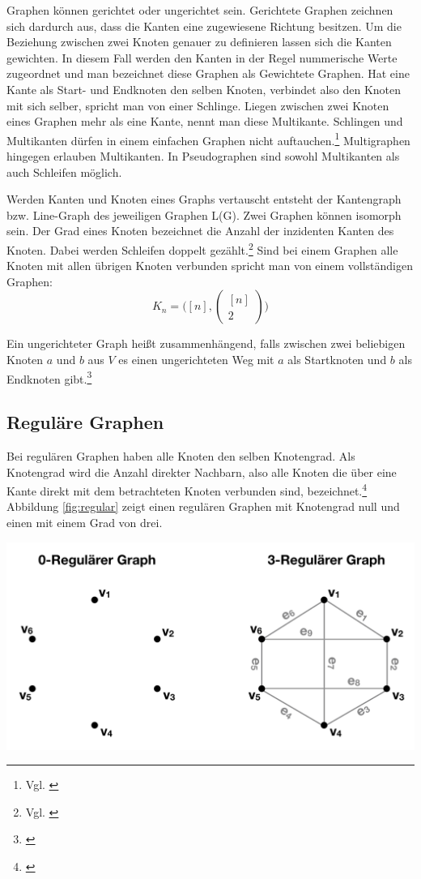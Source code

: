 Graphen können gerichtet oder ungerichtet sein.
Gerichtete Graphen zeichnen sich dardurch aus, dass die Kanten eine zugewiesene Richtung besitzen.
Um die Beziehung zwischen zwei Knoten genauer zu definieren lassen sich die Kanten gewichten.
In diesem Fall werden den Kanten in der Regel nummerische Werte zugeordnet und man bezeichnet diese Graphen als Gewichtete Graphen.
Hat eine Kante als Start- und Endknoten den selben Knoten, verbindet also den Knoten mit sich selber, spricht man von einer Schlinge.
Liegen zwischen zwei Knoten eines Graphen mehr als eine Kante, nennt man diese Multikante.
Schlingen und Multikanten dürfen in einem einfachen Graphen nicht auftauchen.\footnote{Vgl. \cite{felsner01}}
Multigraphen hingegen erlauben Multikanten. In Pseudographen sind sowohl Multikanten als auch Schleifen möglich.

Werden Kanten und Knoten eines Graphs vertauscht entsteht der Kantengraph bzw. Line-Graph des jeweiligen Graphen L(G).
Zwei Graphen können isomorph sein.
Der Grad eines Knoten bezeichnet die Anzahl der inzidenten Kanten des Knoten.
Dabei werden Schleifen doppelt gezählt.\footnote{Vgl. \cite[Seite 13]{rahm2017}}
Sind bei einem Graphen alle Knoten mit allen übrigen Knoten verbunden spricht man von einem vollständigen Graphen:
	\[K_{n}=\big([n],\begin{pmatrix}
		[n] \\ 2
	\end{pmatrix}\big)\]

Ein ungerichteter Graph heißt zusammenhängend, falls zwischen zwei beliebigen Knoten $a$ und $b$ aus $V$ es einen ungerichteten Weg mit $a$ als Startknoten und $b$ als Endknoten gibt.\footnote{\cite[36-38]{krumke2012graphentheoretische}}

\subsection{Reguläre Graphen}
Bei regulären Graphen haben alle Knoten den selben Knotengrad.
Als Knotengrad wird die Anzahl direkter Nachbarn, also alle Knoten die über eine Kante direkt mit dem betrachteten Knoten verbunden sind, bezeichnet.\footnote{\cite{felsner2012geometric}}
Abbildung \ref{fig:regular} zeigt einen regulären Graphen mit Knotengrad null und einen mit einem Grad von drei.
\begin{center}
	\includegraphics[scale = 0.4]{./images/Regulaerer_graph.png}
	\label{fig:regular}
\end{center}
